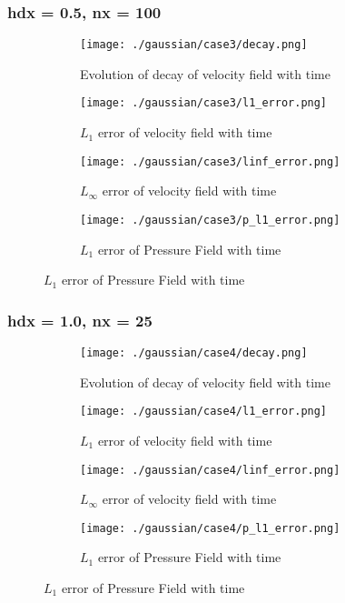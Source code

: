 \documentclass[11pt, a4paper]{article}
\begin{document}
\subsubsection{hdx = 0.5, nx = 100}
\begin{figure}[H]
\begin{subfigure}{0.48\textwidth}
\texttt{[image: ./gaussian/case3/decay.png]}
\caption{Evolution of decay of velocity field with time}
\end{subfigure}
\begin{subfigure}{0.48\textwidth}
\texttt{[image: ./gaussian/case3/l1\_error.png]}
\caption{$L_1$ error of velocity field with time}
\end{subfigure}
\medskip
\begin{subfigure}{0.48\textwidth}
\texttt{[image: ./gaussian/case3/linf\_error.png]}
\caption{$L_\infty$ error of velocity field with time}
\end{subfigure}
\begin{subfigure}{0.48\textwidth}
\texttt{[image: ./gaussian/case3/p\_l1\_error.png]}
\caption{$L_1$ error of Pressure Field with time}
\end{subfigure}
\end{figure}

\subsubsection{hdx = 1.0, nx = 25}
\begin{figure}[H]
\begin{subfigure}{0.48\textwidth}
\texttt{[image: ./gaussian/case4/decay.png]}
\caption{Evolution of decay of velocity field with time}
\end{subfigure}
\begin{subfigure}{0.48\textwidth}
\texttt{[image: ./gaussian/case4/l1\_error.png]}
\caption{$L_1$ error of velocity field with time}
\end{subfigure}
\medskip
\begin{subfigure}{0.48\textwidth}
\texttt{[image: ./gaussian/case4/linf\_error.png]}
\caption{$L_\infty$ error of velocity field with time}
\end{subfigure}
\begin{subfigure}{0.48\textwidth}
\texttt{[image: ./gaussian/case4/p\_l1\_error.png]}
\caption{$L_1$ error of Pressure Field with time}
\end{subfigure}
\end{figure}
\end{document}
